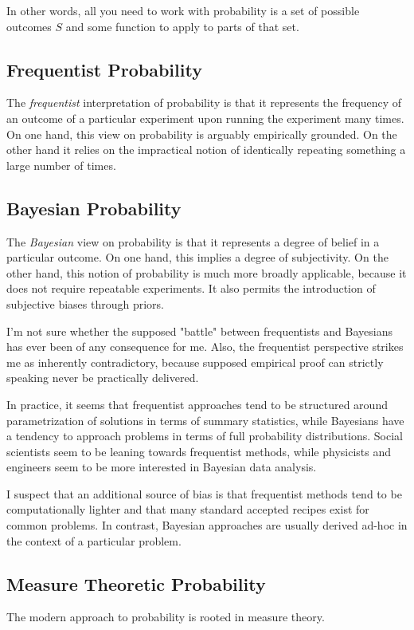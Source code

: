 In other words, all you need to work with probability is a set of possible outcomes $S$ and some function to apply to parts of that set.

\subsection{Frequentist Probability}
The \textit{frequentist} interpretation of probability is that it represents the frequency of an outcome of a particular experiment upon running the experiment many times. On one hand, this view on probability is arguably empirically grounded. On the other hand it relies on the impractical notion of identically repeating something a large number of times. 

\subsection{Bayesian Probability}
The \textit{Bayesian} view on probability is that it represents a degree of belief in a particular outcome. On one hand, this implies a degree of subjectivity. On the other hand, this notion of probability is much more broadly applicable, because it does not require repeatable experiments. It also permits the introduction of subjective biases through priors.

I'm not sure whether the supposed "battle" between frequentists and Bayesians has ever been of any consequence for me. Also, the frequentist perspective strikes me as inherently contradictory, because supposed empirical proof can strictly speaking never be practically delivered.

In practice, it seems that frequentist approaches tend to be structured around parametrization of solutions in terms of summary statistics, while Bayesians have a tendency to approach problems in terms of full probability distributions. Social scientists seem to be leaning towards frequentist methods, while physicists and engineers seem to be more interested in Bayesian data analysis. 

I suspect that an additional source of bias is that frequentist methods tend to be computationally lighter and that many standard accepted recipes exist for common problems. In contrast, Bayesian approaches are usually derived ad-hoc in the context of a particular problem.

\subsection{Measure Theoretic Probability}
The modern approach to probability is rooted in measure theory. 

